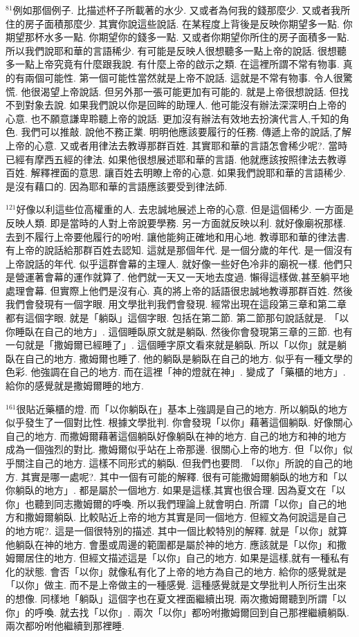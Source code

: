\documentclass{book}
\begin{document}
$^{81}$例如那個例子.
比描述杯子所載著的水少.
又或者為何我的錢那麼少.
又或者我所住的房子面積那麼少.
其實你說這些說話.
在某程度上背後是反映你期望多一點.
你期望那杯水多一點.
你期望你的錢多一點.
又或者你期望你所住的房子面積多一點.
所以我們說耶和華的言語稀少.
有可能是反映人很想聽多一點上帝的說話.
很想聽多一點上帝究竟有什麼跟我說.
有什麼上帝的啟示之類.
在這裡所謂不常有物事.
真的有兩個可能性.
第一個可能性當然就是上帝不說話.
這就是不常有物事.
令人很驚慌.
他很渴望上帝說話.
但另外那一張可能更加有可能的.
就是上帝很想說話.
但找不到對象去說.
如果我們說以你是回眸的助理人.
他可能沒有辦法深深明白上帝的心意.
也不願意謙卑聆聽上帝的說話.
更加沒有辦法有效地去扮演代言人,千知的角色.
我們可以推敲.
說他不務正業.
明明他應該要履行的任務.
傳遞上帝的說話,了解上帝的心意.
又或者用律法去教導那群百姓.
其實耶和華的言語怎會稀少呢?.
當時已經有摩西五經的律法.
如果他很想展述耶和華的言語.
他就應該按照律法去教導百姓.
解釋裡面的意思.
讓百姓去明瞭上帝的心意.
如果我們說耶和華的言語稀少.
是沒有藉口的.
因為耶和華的言語應該要受到律法師.

$^{121}$好像以利這些位高權重的人.
去忠誠地展述上帝的心意.
但是這個稀少.
一方面是反映人類.
即是當時的人對上帝說要學務.
另一方面就反映以利.
就好像廟祝那樣.
去到不履行上帝要他履行的吩咐.
讓他能夠正確地和用心地.
教導耶和華的律法書.
有上帝的說話給那群百姓去認知.
這就是那個年代.
是一個分歲的年代.
是一個沒有上帝說話的年代.
似乎這群會幕的主理人.
就好像一些好色冷非的廟祝一樣.
他們只是營運著會幕的運作就算了.
他們就一天又一天地去度過.
懶得這樣做,甚至躺平地處理會幕.
但實際上他們是沒有心.
真的將上帝的話語很忠誠地教導那群百姓.
然後我們會發現有一個字眼.
用文學批判我們會發現.
經常出現在這段第三章和第二章都有這個字眼.
就是「躺臥」這個字眼.
包括在第二節.
第二節那句說話就是.
「以你睡臥在自己的地方」.
這個睡臥原文就是躺臥.
然後你會發現第三章的三節.
也有一句就是「撒姆爾已經睡了」.
這個睡字原文看來就是躺臥.
所以「以你」就是躺臥在自己的地方.
撒姆爾也睡了.
他的躺臥是躺臥在自己的地方.
似乎有一種文學的色彩.
他強調在自己的地方.
而在這裡「神的燈就在神」.
變成了「藥櫃的地方」.
給你的感覺就是撒姆爾睡的地方.

$^{161}$很貼近藥櫃的燈.
而「以你躺臥在」基本上強調是自己的地方.
所以躺臥的地方似乎發生了一個對比性.
根據文學批判.
你會發現「以你」藉著這個躺臥.
好像關心自己的地方.
而撒姆爾藉著這個躺臥好像躺臥在神的地方.
自己的地方和神的地方成為一個強烈的對比.
撒姆爾似乎站在上帝那邊.
很關心上帝的地方.
但「以你」似乎關注自己的地方.
這樣不同形式的躺臥.
但我們也要問.
「以你」所說的自己的地方.
其實是哪一處呢?.
其中一個有可能的解釋.
很有可能撒姆爾躺臥的地方和「以你躺臥的地方」.
都是屬於一個地方.
如果是這樣,其實也很合理.
因為夏文在「以你」也聽到同志撒姆爾的呼喚.
所以我們理論上就會明白.
所謂「以你」自己的地方和撒姆爾躺臥.
比較貼近上帝的地方其實是同一個地方.
但經文為何說這是自己的地方呢?.
這是一個很特別的描述.
其中一個比較特別的解釋.
就是「以你」就算他躺臥在神的地方.
會墨或周邊的範圍都是屬於神的地方.
應該就是「以你」和撒姆爾居住的地方.
但經文描述這是「以你」自己的地方.
如果是這樣,就有一種私有化的狀態.
會否「以你」就像私有化了上帝的地方為自己的地方.
給你的感覺就是「以你」做主.
而不是上帝做主的一種感覺.
這種感覺就是文學批判人所衍生出來的想像.
同樣地「躺臥」這個字也在夏文裡面繼續出現.
兩次撒姆爾聽到所謂「以你」的呼喚.
就去找「以你」.
兩次「以你」都吩咐撒姆爾回到自己那裡繼續躺臥.
兩次都吩咐他繼續到那裡睡.
\end{document}

